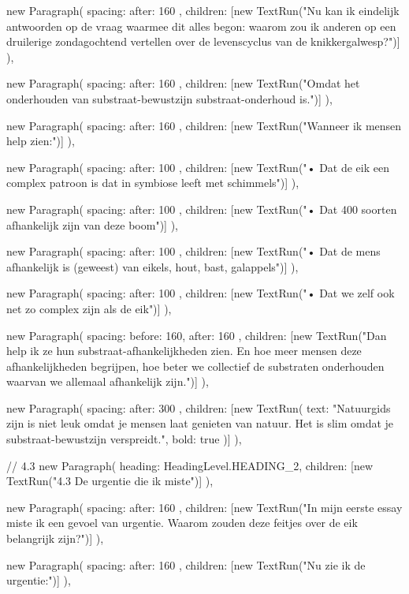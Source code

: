 {{      new Paragraph({
        spacing: { after: 160 },
        children: [new TextRun("Nu kan ik eindelijk antwoorden op de vraag waarmee dit alles begon: waarom zou ik anderen op een druilerige zondagochtend vertellen over de levenscyclus van de knikkergalwesp?")]
      }),

      new Paragraph({
        spacing: { after: 160 },
        children: [new TextRun("Omdat het onderhouden van substraat-bewustzijn substraat-onderhoud is.")]
      }),

      new Paragraph({
        spacing: { after: 160 },
        children: [new TextRun("Wanneer ik mensen help zien:")]
      }),

      new Paragraph({
        spacing: { after: 100 },
        children: [new TextRun("• Dat de eik een complex patroon is dat in symbiose leeft met schimmels")]
      }),

      new Paragraph({
        spacing: { after: 100 },
        children: [new TextRun("• Dat 400 soorten afhankelijk zijn van deze boom")]
      }),

      new Paragraph({
        spacing: { after: 100 },
        children: [new TextRun("• Dat de mens afhankelijk is (geweest) van eikels, hout, bast, galappels")]
      }),

      new Paragraph({
        spacing: { after: 100 },
        children: [new TextRun("• Dat we zelf ook net zo complex zijn als de eik")]
      }),

      new Paragraph({
        spacing: { before: 160, after: 160 },
        children: [new TextRun("Dan help ik ze hun substraat-afhankelijkheden zien. En hoe meer mensen deze afhankelijkheden begrijpen, hoe beter we collectief de substraten onderhouden waarvan we allemaal afhankelijk zijn.")]
      }),

      new Paragraph({
        spacing: { after: 300 },
        children: [new TextRun({ text: "Natuurgids zijn is niet leuk omdat je mensen laat genieten van natuur. Het is slim omdat je substraat-bewustzijn verspreidt.", bold: true })]
      }),

      // 4.3
      new Paragraph({
        heading: HeadingLevel.HEADING_2,
        children: [new TextRun("4.3 De urgentie die ik miste")]
      }),

      new Paragraph({
        spacing: { after: 160 },
        children: [new TextRun("In mijn eerste essay miste ik een gevoel van urgentie. Waarom zouden deze feitjes over de eik belangrijk zijn?")]
      }),

      new Paragraph({
        spacing: { after: 160 },
        children: [new TextRun("Nu zie ik de urgentie:")]
      }),

}}

